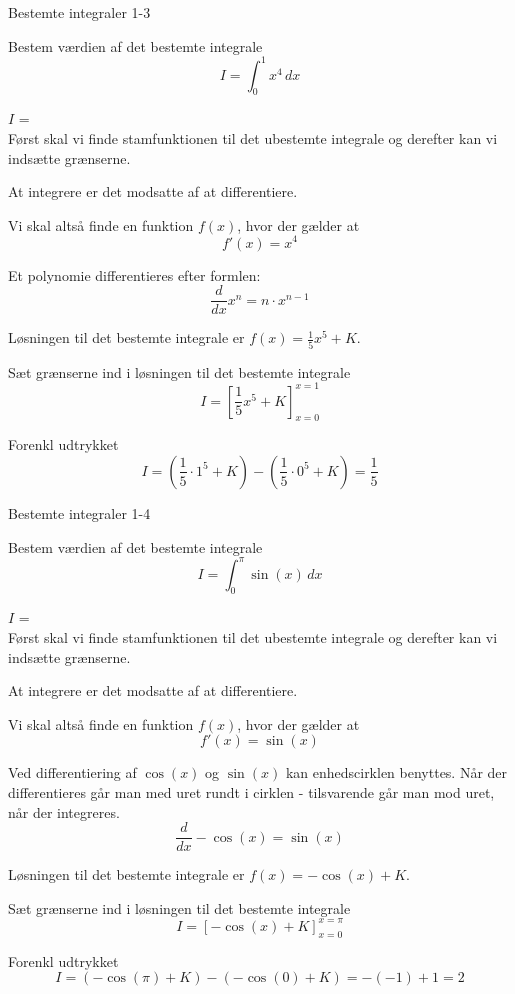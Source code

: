 \documentclass{article}
\begin{document}
\newpage

\begin{exercise}{Bestemte integraler 1-3}
	
	Bestem værdien af det bestemte integrale
	\[
	I = \int_0^1 x^4 \, dx
	\]
	
	$I$ =  \\
	
	
	\hint
	Først skal vi finde stamfunktionen til det ubestemte integrale og derefter kan vi indsætte grænserne.
	
	\hint
	At integrere er det modsatte af at differentiere.
	
	\hint
	Vi skal altså finde en funktion $f(x)$, hvor der gælder at
	\[
	f'(x) = x^4
	\]
	
	\hint
	Et polynomie differentieres efter formlen:
	\[
	\frac{d}{dx} x^n = n \cdot x^{n - 1}
	\]
	
	\hint
	Løsningen til det bestemte integrale er $f(x) = \frac{1}{5} x^5 + K$.
	
	\hint
	Sæt grænserne ind i løsningen til det bestemte integrale
	\[
	I = \left[ \frac{1}{5} x^5 + K \right]_{x=0}^{x=1}
	\]
	
	\hint
	Forenkl udtrykket
	\[
	I = \left( \frac{1}{5} \cdot 1^5 + K \right) - \left( \frac{1}{5} \cdot 0^5 + K \right) = \frac{1}{5}
	\]
	
	
\end{exercise}

\newpage

\begin{exercise}{Bestemte integraler 1-4}
	
	Bestem værdien af det bestemte integrale
	\[
	I = \int_0^{\pi} \sin(x) \, dx
	\]
	
	$I$ =  \\
	
	
	\hint
	Først skal vi finde stamfunktionen til det ubestemte integrale og derefter kan vi indsætte grænserne.
	
	\hint
	At integrere er det modsatte af at differentiere.
	
	\hint
	Vi skal altså finde en funktion $f(x)$, hvor der gælder at
	\[
	f'(x) = \sin(x)
	\]
	
	\hint
	Ved differentiering af $\cos(x)$ og $\sin(x)$ kan enhedscirklen benyttes. Når der differentieres går man med uret rundt i cirklen - tilsvarende går man mod uret, når der integreres. 
	\[
	\frac{d}{dx} - \cos(x) = \sin(x)
	\]
	
	\hint
	Løsningen til det bestemte integrale er $f(x) = -\cos(x) + K$.
	
	\hint
	Sæt grænserne ind i løsningen til det bestemte integrale
	\[
	I = \left[- \cos(x) + K \right]_{x=0}^{x=\pi}
	\]
	
	\hint
	Forenkl udtrykket
	\[
	I = \left( - \cos(\pi) + K \right) - \left( - \cos(0) + K \right) = - (-1) + 1 = 2
	\]
	
	
\end{exercise}
\end{document}

